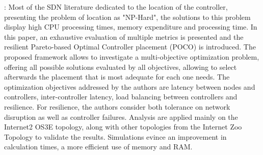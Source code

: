 \documentclass[a4paper,10pt]{article}
\begin{document}



\cite{HoHa13}: Most of the SDN literature dedicated to the location of the controller, presenting the problem of location as "NP-Hard", the solutions to this problem display high CPU processing times, memory expenditure and processing time.
In this paper, an exhaustive evaluation of multiple metrics is presented and the resilient Pareto-based Optimal Controller placement (POCO) is introduced. The proposed framework allows to investigate a multi-objective optimization problem, offering all possible solutions evaluated by all objectives, allowing to select afterwards the placement that is most adequate for each one needs. The optimization objectives addressed by the authors are latency between nodes and controllers, inter-controller latency, load balancing between controllers and resilience. For resilience, the authors consider both tolerance on network disruption as well as controller failures. Analysis are applied mainly on the Internet2 OS3E topology, along with other topologies from the Internet Zoo Topology to validate the results. Simulations evince an improvement in calculation times, a more efficient use of memory and RAM.
\end{document}

